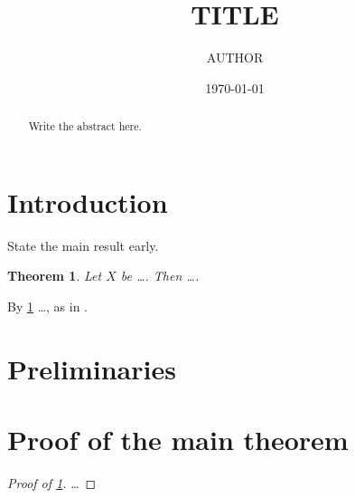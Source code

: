 \documentclass[11pt]{article}
\title{{{TITLE}}}
\author{{{AUTHOR}}}
\date{\today}
\theoremstyle{plain}
\newtheorem{theorem}{Theorem}[section]
\theoremstyle{definition}
\theoremstyle{remark}
\begin{document}
\maketitle

\begin{abstract}
Write the abstract here.
\end{abstract}

\section{Introduction}\label{sec:intro}
State the main result early.

\begin{theorem}\label{thm:main}
Let $X$ be \dots. Then \dots.
\end{theorem}

By \cref{thm:main} \dots, as in \cite{example2024}.

\section{Preliminaries}

\section{Proof of the main theorem}
\begin{proof}[Proof of \cref{thm:main}]
\dots
\end{proof}



\end{document}

